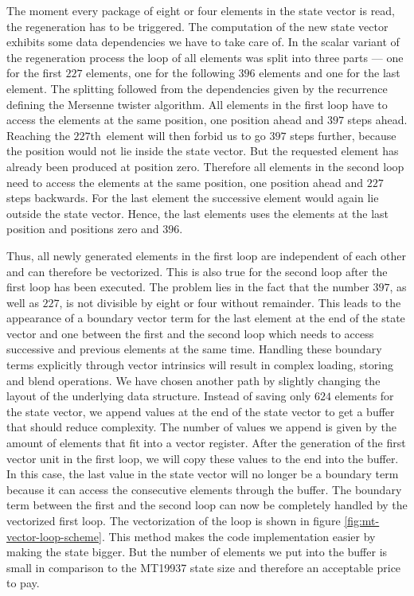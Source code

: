 \documentclass{stdlocal}
\begin{document}
    The moment every package of eight or four elements in the state vector is read, the regeneration has to be triggered.
    The computation of the new state vector exhibits some data dependencies we have to take care of.
    In the scalar variant of the regeneration process the loop of all elements was split into three parts --- one for the first $227$ elements, one for the following $396$ elements and one for the last element.
    The splitting followed from the dependencies given by the recurrence defining the Mersenne twister algorithm.
    All elements in the first loop have to access the elements at the same position, one position ahead and $397$ steps ahead.
    Reaching the $227$th~element will then forbid us to go $397$ steps further, because the position would not lie inside the state vector.
    But the requested element has already been produced at position zero.
    Therefore all elements in the second loop need to access the elements at the same position, one position ahead and $227$ steps backwards.
    For the last element the successive element would again lie outside the state vector.
    Hence, the last elements uses the elements at the last position and positions zero and $396$.

    Thus, all newly generated elements in the first loop are independent of each other and can therefore be vectorized.
    This is also true for the second loop after the first loop has been executed.
    The problem lies in the fact that the number $397$, as well as $227$, is not divisible by eight or four without remainder.
    This leads to the appearance of a boundary vector term for the last element at the end of the state vector and one between the first and the second loop which needs to access successive and previous elements at the same time.
    Handling these boundary terms explicitly through vector intrinsics will result in complex loading, storing and blend operations.
    We have chosen another path by slightly changing the layout of the underlying data structure.
    Instead of saving only $624$ elements for the state vector, we append values at the end of the state vector to get a buffer that should reduce complexity.
    The number of values we append is given by the amount of elements that fit into a vector register.
    After the generation of the first vector unit in the first loop, we will copy these values to the end into the buffer.
    In this case, the last value in the state vector will no longer be a boundary term because it can access the consecutive elements through the buffer.
    The boundary term between the first and the second loop can now be completely handled by the vectorized first loop.
    The vectorization of the loop is shown in figure \ref{fig:mt-vector-loop-scheme}.
    This method makes the code implementation easier by making the state bigger.
    But the number of elements we put into the buffer is small in comparison to the MT19937 state size and therefore an acceptable price to pay.
\end{document}
